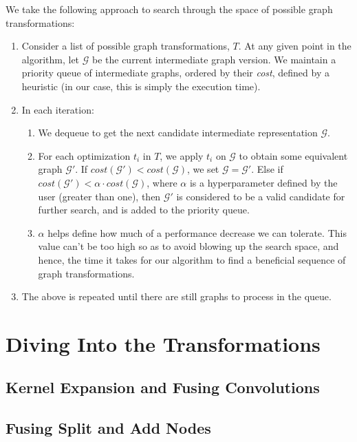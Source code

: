 \documentclass[10pt a4paper twoside]{report}
\begin{document}
		We take the following approach to search through the space of possible graph transformations:
		\begin{enumerate}
			\item Consider a list of possible graph transformations, $T$. At any given point in the algorithm, let $\mathcal{G}$ be the current intermediate graph version. We maintain a priority queue of intermediate graphs, ordered by their \textit{cost}, defined by a heuristic (in our case, this is simply the execution time).
			\item In each iteration:
				\begin{enumerate}
					\item We dequeue to get the next candidate intermediate representation $\mathcal{G}$. 
					\item For each optimization $t_i$ in $T$, we apply $t_i$ on $\mathcal{G}$ to obtain some equivalent graph $\mathcal{G}'$. If $cost(\mathcal{G}') < cost(\mathcal{G})$, we set $\mathcal{G} = \mathcal{G}'$. Else if $cost(\mathcal{G}') < \alpha \cdot cost(\mathcal{G})$, where $\alpha$ is a hyperparameter defined by the user (greater than one), then $\mathcal{G}'$ is considered to be a valid candidate for further search, and is added to the priority queue.
					\item $\alpha$ helps define how much of a performance decrease we can tolerate. This value can't be too high so as to avoid blowing up the search space, and hence, the time it takes for our algorithm to find a beneficial sequence of graph transformations.
				\end{enumerate}

			\item The above is repeated until there are still graphs to process in the queue.

		\end{enumerate}
	\section{Diving Into the Transformations}
		\subsection{Kernel Expansion and Fusing Convolutions}
		\subsection{Fusing Split and Add Nodes}
\end{document}
